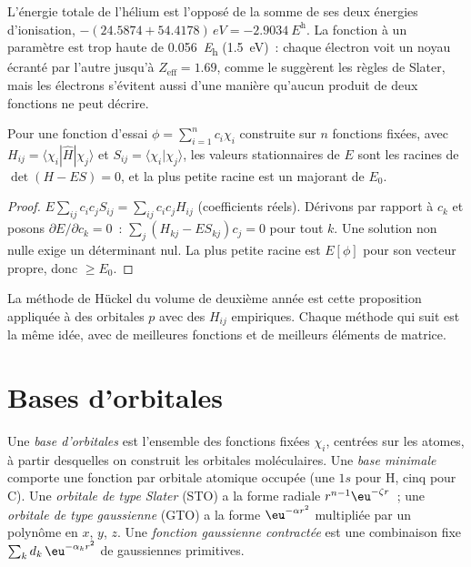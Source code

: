 \begin{example}\label{ex:b3:computational-chemistry:helium}
L'énergie totale de l'hélium est l'opposé de la somme de ses deux
énergies d'ionisation,
$-(24.5874 + 54.4178)\,\unit{eV} = \qty{-2.9034}{\hartree}$. La fonction à
un paramètre est trop haute de \qty{0.056}{\hartree} (\qty{1.5}{eV})~:
chaque électron voit un noyau écranté par l'autre jusqu'à
$Z_{\mathrm{eff}} = 1.69$, comme le suggèrent les règles de Slater, mais
les électrons s'évitent aussi d'une manière qu'aucun produit de deux
fonctions ne peut décrire.
\end{example}

\begin{proposition}\label{prop:b3:computational-chemistry:linear-variation}
Pour une fonction d'essai $\phi = \sum_{i=1}^n c_i\chi_i$ construite sur
$n$ fonctions fixées,
avec $H_{ij} = \langle\chi_i|\hat H|\chi_j\rangle$ et $S_{ij} = \langle\chi_i|\chi_j
\rangle$, les valeurs stationnaires de $E$ sont les racines de
$\det(H - ES) = 0$, et la plus petite racine est un majorant de $E_0$.
\end{proposition}

\begin{proof}
$E\sum_{ij}c_ic_jS_{ij} = \sum_{ij}c_ic_jH_{ij}$ (coefficients réels).
Dérivons par rapport à $c_k$ et posons $\partial E/\partial c_k = 0$~: $\sum_j(H_{kj} -
ES_{kj})c_j = 0$ pour tout $k$. Une solution non nulle exige un
déterminant nul. La plus petite racine est $E[\phi]$ pour son vecteur
propre, donc $\ge E_0$.
\end{proof}

La méthode de Hückel du volume de deuxième année est cette proposition
appliquée à des orbitales $p$ avec des $H_{ij}$ empiriques. Chaque méthode
qui suit est la même idée, avec de meilleures fonctions et de meilleurs
éléments de matrice.

\section{Bases d'orbitales}

\begin{definition}\label{def:b3:computational-chemistry:basis}
Une \emph{base d'orbitales} est l'ensemble des fonctions fixées $\chi_i$,
centrées sur les atomes, à partir desquelles on construit les orbitales
moléculaires. Une
\emph{base minimale} comporte une fonction par
orbitale atomique occupée (une $1s$ pour H, cinq pour C). Une
\emph{orbitale de type Slater} (STO) a la forme radiale
$r^{n-1}\eu^{-\zeta r}$~; une \emph{orbitale de type gaussienne}
(GTO) a la forme $\eu^{-\alpha r^2}$ multipliée par un polynôme en $x$, $y$,
$z$. Une \emph{fonction gaussienne contractée}
est une combinaison fixe $\sum_kd_k\,\eu^{-\alpha_kr^2}$ de gaussiennes primitives.
\end{definition}

